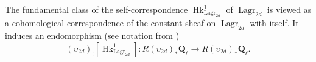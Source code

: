 \documentclass[reqno]{amsart}
\numberwithin{equation}{section}
\newcommand{\Q}{\mathbf{Q}}
\newcommand{\ol}[1]{\overline{#1}}
\newcommand{\co}{\colon}
\DeclareMathOperator{\rank}{rank}
\DeclareMathOperator{\Hk}{Hk}
\DeclareMathOperator{\Herm}{Herm}
\DeclareMathOperator{\Lagr}{Lagr}
\newcommand{\Qlbar}{\overline{\Q}_\ell}
\newcommand\cL{\mathcal{L}}
\newcommand\cQ{\mathcal{Q}}
\newtheorem{lemma}[thm]{Lemma}
\theoremstyle{remark}
\numberwithin{equation}{section}
\begin{document}
%
%
%
%

The fundamental class of the self-correspondence $\Hk^{1}_{\Lagr_{2d}}$ of $\Lagr_{2d}$ is viewed as a cohomological correspondence of the constant sheaf on $\Lagr_{2d}$ with itself. It induces an endomorphism (see notation from \cite[A.4.1]{YZ})
\begin{equation}
(\upsilon_{2d})_{!}[\Hk^{1}_{\Lagr_{2d}}]:R(\upsilon_{2d})_{*}\Qlbar\to R(\upsilon_{2d})_{*}\Qlbar.
\end{equation}
\end{document}
